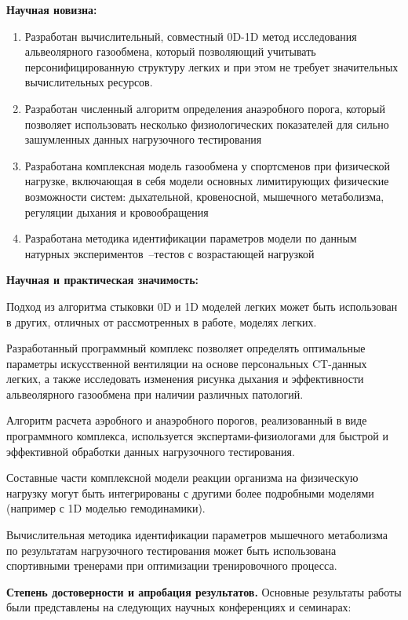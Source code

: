 \textbf{Научная новизна:}
\begin{enumerate}
 \item 
Разработан вычислительный, совместный 0D-1D метод исследования альвеолярного газообмена, который позволяющий учитывать персонифицированную структуру легких и при этом не требует значительных вычислительных ресурсов.
 \item 
 Разработан численный алгоритм определения анаэробного порога, который позволяет использовать несколько физиологических показателей для сильно зашумленных данных нагрузочного тестирования
 \item
 Разработана комплексная модель газообмена у спортсменов при физической нагрузке, включающая в себя модели основных лимитирующих физические возможности систем: дыхательной, кровеносной, мышечного метаболизма, регуляции дыхания и кровообращения
 \item
 Разработана методика идентификации параметров модели по данным натурных экспериментов~--тестов с возрастающей нагрузкой
  
\end{enumerate}

\textbf{Научная и практическая значимость:} 

Подход из алгоритма стыковки 0D и 1D моделей легких может быть использован в  других, отличных от рассмотренных в работе, моделях легких.

Разработанный программный комплекс позволяет определять оптимальные параметры искусственной вентиляции на основе персональных CT-данных легких, а также исследовать изменения рисунка дыхания и эффективности альвеолярного газообмена при наличии различных патологий. 

Алгоритм расчета аэробного и анаэробного порогов, реализованный в виде программного комплекса, используется экспертами-физиологами для быстрой и эффективной обработки данных нагрузочного тестирования.

Составные части комплексной модели реакции организма на физическую нагрузку могут быть интегрированы с другими более подробными моделями (например с 1D моделью гемодинамики).

Вычислительная методика идентификации параметров мышечного метаболизма по результатам нагрузочного тестирования может быть использована спортивными тренерами при оптимизации тренировочного процесса.

\textbf{Степень достоверности и апробация результатов.} Основные результаты работы были представлены на следующих научных конференциях и семинарах:

